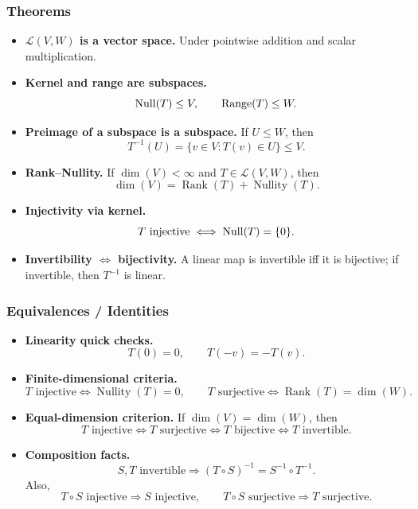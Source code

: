 \subsubsection*{Theorems}

\begin{itemize}[leftmargin=*]
\item \textbf{$\mathcal L(V,W)$ is a vector space.} Under pointwise addition and scalar multiplication.

\item \textbf{Kernel and range are subspaces.}
\[
\operatorname{Null}(T)\le V,
\qquad
\operatorname{Range}(T)\le W.
\]

\item \textbf{Preimage of a subspace is a subspace.} If $U\le W$, then
\[
T^{-1}(U)=\{v\in V:T(v)\in U\}\le V.
\]

\item \textbf{Rank--Nullity.} If $\dim(V)<\infty$ and $T\in\mathcal L(V,W)$, then
\[
\dim(V)=\operatorname{Rank}(T)+\operatorname{Nullity}(T).
\]

\item \textbf{Injectivity via kernel.}
\[
T\text{ injective}\iff \operatorname{Null}(T)=\{0\}.
\]

\item \textbf{Invertibility $\iff$ bijectivity.} A linear map is invertible iff it is bijective; if invertible, then $T^{-1}$ is linear.
\end{itemize}

\subsubsection*{Equivalences / Identities}

\begin{itemize}[leftmargin=*]
\item \textbf{Linearity quick checks.}
\[
T(0)=0,
\qquad
T(-v)=-T(v).
\]

\item \textbf{Finite-dimensional criteria.}
\[
T\text{ injective}
\iff \operatorname{Nullity}(T)=0,
\qquad
T\text{ surjective}
\iff \operatorname{Rank}(T)=\dim(W).
\]

\item \textbf{Equal-dimension criterion.} If $\dim(V)=\dim(W)$, then
\[
T\text{ injective}
\iff T\text{ surjective}
\iff T\text{ bijective}
\iff T\text{ invertible}.
\]

\item \textbf{Composition facts.}
\[
S,T\text{ invertible}\Rightarrow (T\circ S)^{-1}=S^{-1}\circ T^{-1}.
\]
Also,
\[
T\circ S\text{ injective}\Rightarrow S\text{ injective},
\qquad
T\circ S\text{ surjective}\Rightarrow T\text{ surjective}.
\]
\end{itemize}

